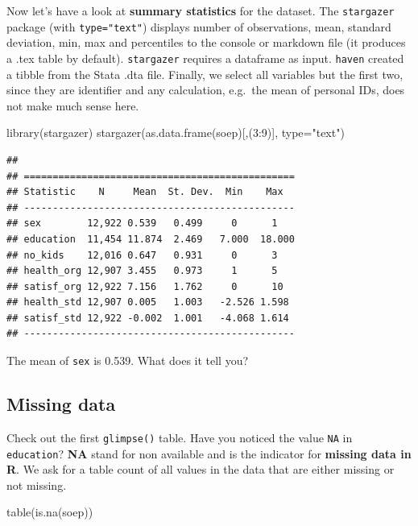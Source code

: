 \documentclass[
]{book}
\newenvironment{Shaded}{\begin{snugshade}}{\end{snugshade}}
\newcommand{\AttributeTok}[1]{\textcolor[rgb]{0.77,0.63,0.00}{#1}}
\newcommand{\DecValTok}[1]{\textcolor[rgb]{0.00,0.00,0.81}{#1}}
\newcommand{\FunctionTok}[1]{\textcolor[rgb]{0.00,0.00,0.00}{#1}}
\newcommand{\NormalTok}[1]{#1}
\newcommand{\SpecialCharTok}[1]{\textcolor[rgb]{0.00,0.00,0.00}{#1}}
\newcommand{\StringTok}[1]{\textcolor[rgb]{0.31,0.60,0.02}{#1}}
\begin{document}
Now let's have a look at \textbf{summary statistics} for the dataset. The \texttt{stargazer} package (with \texttt{type="text"}) displays number of observations, mean, standard deviation, min, max and percentiles to the console or markdown file (it produces a .tex table by default). \texttt{stargazer} requires a dataframe as input. \texttt{haven} created a tibble from the Stata .dta file. Finally, we select all variables but the first two, since they are identifier and any calculation, e.g.~the mean of personal IDs, does not make much sense here.

\begin{Shaded}
\begin{Highlighting}[]
\FunctionTok{library}\NormalTok{(stargazer)}
\FunctionTok{stargazer}\NormalTok{(}\FunctionTok{as.data.frame}\NormalTok{(soep)[,(}\DecValTok{3}\SpecialCharTok{:}\DecValTok{9}\NormalTok{)], }\AttributeTok{type=}\StringTok{"text"}\NormalTok{)}
\end{Highlighting}
\end{Shaded}

\begin{verbatim}
## 
## ===============================================
## Statistic    N     Mean  St. Dev.  Min    Max  
## -----------------------------------------------
## sex        12,922 0.539   0.499     0      1   
## education  11,454 11.874  2.469   7.000  18.000
## no_kids    12,016 0.647   0.931     0      3   
## health_org 12,907 3.455   0.973     1      5   
## satisf_org 12,922 7.156   1.762     0      10  
## health_std 12,907 0.005   1.003   -2.526 1.598 
## satisf_std 12,922 -0.002  1.001   -4.068 1.614 
## -----------------------------------------------
\end{verbatim}

The mean of \texttt{sex} is 0.539. What does it tell you?

\hypertarget{missing-data}{%
\subsection{Missing data}\label{missing-data}}

Check out the first \texttt{glimpse()} table. Have you noticed the value \texttt{NA} in \texttt{education}? \textbf{NA} stand for non available and is the indicator for \textbf{missing data in R}. We ask for a table count of all values in the data that are either missing or not missing.

\begin{Shaded}
\begin{Highlighting}[]
\FunctionTok{table}\NormalTok{(}\FunctionTok{is.na}\NormalTok{(soep))}
\end{Highlighting}
\end{Shaded}
\end{document}
